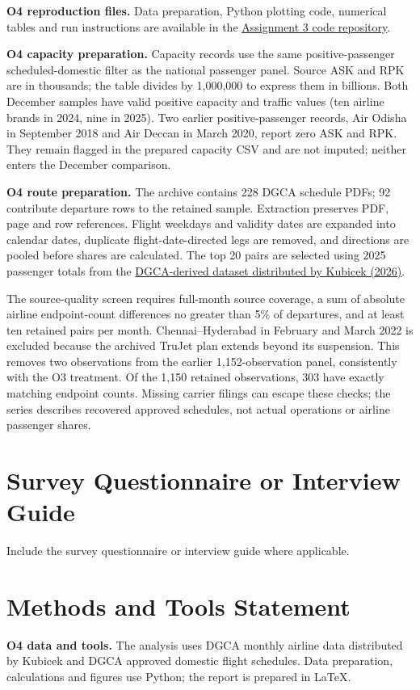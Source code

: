 \documentclass[12pt,a4paper]{article}
\begin{document}
\textbf{O4 reproduction files.} Data preparation, Python plotting code, numerical tables and run instructions are available in the \href{https://github.com/Goutham7358/Assignment3_Code}{Assignment 3 code repository}.

\textbf{O4 capacity preparation.} Capacity records use the same positive-passenger scheduled-domestic filter as the national passenger panel. Source ASK and RPK are in thousands; the table divides by 1,000,000 to express them in billions. Both December samples have valid positive capacity and traffic values (ten airline brands in 2024, nine in 2025). Two earlier positive-passenger records, Air Odisha in September 2018 and Air Deccan in March 2020, report zero ASK and RPK. They remain flagged in the prepared capacity CSV and are not imputed; neither enters the December comparison.

\textbf{O4 route preparation.} The archive contains 228 DGCA schedule PDFs; 92 contribute departure rows to the retained sample. Extraction preserves PDF, page and row references. Flight weekdays and validity dates are expanded into calendar dates, duplicate flight-date-directed legs are removed, and directions are pooled before shares are calculated. The top 20 pairs are selected using 2025 passenger totals from the \href{https://github.com/mkubicek/india-aviation-stats/tree/16770ac59dae61ce7b80fd8bd67dd7f4cef280a6}{DGCA-derived dataset distributed by Kubicek (2026)}.

The source-quality screen requires full-month source coverage, a sum of absolute airline endpoint-count differences no greater than 5\% of departures, and at least ten retained pairs per month. Chennai--Hyderabad in February and March 2022 is excluded because the archived TruJet plan extends beyond its suspension. This removes two observations from the earlier 1,152-observation panel, consistently with the O3 treatment. Of the 1,150 retained observations, 303 have exactly matching endpoint counts. Missing carrier filings can escape these checks; the series describes recovered approved schedules, not actual operations or airline passenger shares.

\section{Survey Questionnaire or Interview Guide}
Include the survey questionnaire or interview guide where applicable.

\newpage
\section*{Methods and Tools Statement}
\textbf{O4 data and tools.} The analysis uses DGCA monthly airline data distributed by Kubicek and DGCA approved domestic flight schedules. Data preparation, calculations and figures use Python; the report is prepared in LaTeX.
\end{document}
